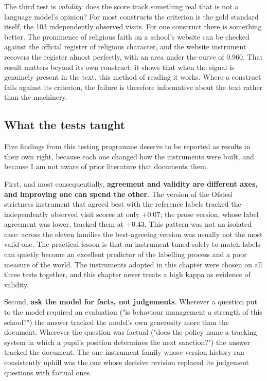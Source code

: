 The third test is \textit{validity}: does the score track something real
that is not a language model's opinion? For most constructs the criterion is
the gold standard itself, the 103 independently observed visits. For one
construct there is something better. The prominence of religious faith on a
school's website can be checked against the official register of religious
character, and the website instrument recovers the register almost
perfectly, with an area under the curve of 0.960. That result matters
beyond its own construct: it shows that when the signal is genuinely present
in the text, this method of reading it works. Where a construct fails
against its criterion, the failure is therefore informative about the text
rather than the machinery.

\subsection{What the tests taught}
\label{sec:p1_scoring_lessons}

Five findings from this testing programme deserve to be reported as results
in their own right, because each one changed how the instruments were built,
and because I am not aware of prior literature that documents them.

First, and most consequentially, \textbf{agreement and validity are
different axes, and improving one can spend the other}. The version of the
Ofsted strictness instrument that agreed best with the reference labels
tracked the independently observed visit scores at only $+0.07$; the prose
version, whose label agreement was lower, tracked them at $+0.43$. This
pattern was not an isolated case: across the eleven families the
best-agreeing version was usually not the most valid one. The practical
lesson is that an instrument tuned solely to match labels can quietly become
an excellent predictor of the labelling process and a poor measure of the
world. The instruments adopted in this chapter were chosen on all three
tests together, and this chapter never treats a high kappa as evidence of
validity.

Second, \textbf{ask the model for facts, not judgements}. Wherever a
question put to the model required an evaluation ("is behaviour management
a strength of this school?") the answer tracked the model's own generosity
more than the document. Wherever the question was factual ("does the policy
name a tracking system in which a pupil's position determines the next
sanction?") the answer tracked the document. The one instrument family
whose version history ran consistently uphill was the one whose decisive
revision replaced its judgement questions with factual ones.


